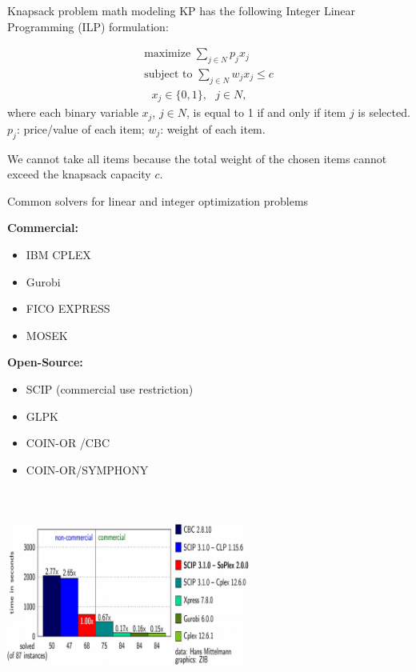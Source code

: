 \documentclass[xcolor=dvipsnames,aspectratio=169]{beamer}
\begin{document}
\begin{frame}{Knapsack problem math modeling}
KP has the
following Integer Linear Programming (ILP) formulation:

\begin{gather}
\text{maximize \ \ \ }\sum_{j\in N}p_{j}x_{j}\text{ \ \ \ \ \ \ \ }
\label{eq:ILP1} \\
\text{subject to \ \ }\sum_{j\in N}w_{j}x_{j}\leq c  \label{eq:ILP2} \\
\text{ \ \ \ \ \ \ \ \ \ \ \ \ \ \ \ \ \ \ \ \ \ \ \ \ \ }x_{j}\in \{0,1\},%
\text{ \ \ }j\in N,  \label{eq:ILP3}
\end{gather}%
where each binary variable $x_{j}$, $j\in N$, is equal to 1 if and only if
item $j$ is selected.
$p_{j}$: price/value of each item; $w_{j}$: weight of each 
item. 

We cannot take all items because the total
weight of the chosen items cannot exceed the knapsack 
capacity $c$.
    
\end{frame}

\begin{frame}{Common solvers for linear and integer optimization problems}
\begin{multicols}{2}

\textbf{Commercial:}
\begin{itemize}
    \item IBM CPLEX 
     \item Gurobi
     \item FICO EXPRESS
     \item MOSEK
\end{itemize}
    
\textbf{Open-Source:}

\begin{itemize}
    \item SCIP (commercial use restriction)
    \item GLPK 
    \item COIN-OR /CBC
    \item COIN-OR/SYMPHONY
\end{itemize}
\columnbreak
        \includegraphics[width=80mm, height = 70mm ]{benchmark.png}

\end{multicols}
\end{frame}
\end{document}
